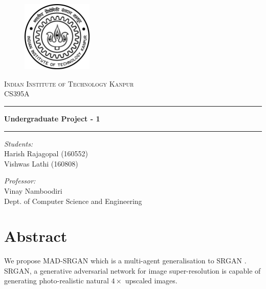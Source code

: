 \documentclass[12pt,a4paper,twocolumn]{article}
\begin{document}
    \begin{titlepage}
        \centering

        \vspace*{2cm}
        \begin{figure}[h]
            \centering
            \includegraphics[width=0.3\textwidth]{images/iitk-logo.png}\\[15mm]
        \end{figure}
        \textsc{\LARGE Indian Institute of Technology Kanpur}\\[1cm]
        {\Large CS395A}\\[7mm]

        \hrule
        \vspace{3mm}
        \textbf{\Large Undergraduate Project - 1}\\[5mm]
        \hrule
        \vspace{3mm}

        \begin{multicols}{2}
            \textit{Students:}\\[2mm]
            Harish Rajagopal (160552)\\
            Vishwas Lathi (160808)\\

            \vfill\null\columnbreak

            \textit{Professor:}\\[2mm]
            Vinay Namboodiri\\
            Dept. of Computer Science and Engineering
        \end{multicols}
    \end{titlepage}


    \section{Abstract}
        We propose MAD-SRGAN which is a multi-agent generalisation to SRGAN \cite{srgan}.
        SRGAN, a generative adversarial network \cite{gan} for image super-resolution is capable of generating photo-realistic natural $4\times$ upscaled images.
\end{document}

